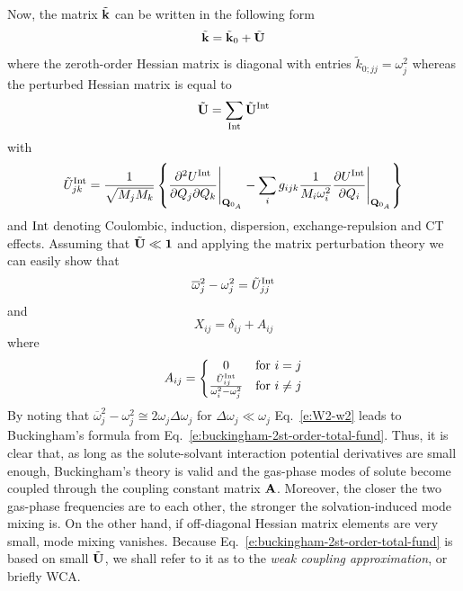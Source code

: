 \documentclass[a4paper,titlepage,twoside,fleqn,12pt]{book}
\newcommand{\fderiv}[2]{\ensuremath{
\frac{\partial #1}{\partial #2}}}
\newcommand{\sderivd}[3]{\ensuremath{
\frac{\partial^2 #1}{\partial #2 \partial #3}
}}
\begin{document}
\begin{refsection}
Now, 
the matrix $\tilde{\bf k}$ can be written
in the following form
%
\begin{equation} 
 \tilde{\bf k} = \tilde{\bf k}_0 + \tilde{\bf U}
\end{equation}
%
where the zeroth\hyp{}order Hessian matrix is diagonal
with entries $\tilde{k}_{0;jj}=\omega_j^2$ whereas
the perturbed Hessian matrix is equal to
%
\begin{equation} 
 \tilde{\bf U} = \sum_{\rm Int} \tilde{\bf U}^{\rm Int}
\end{equation}
%
with
%
\begin{equation} 
 \tilde{U}^{\rm Int}_{jk} = \frac{1}{\sqrt{M_jM_k}} \left\{
            \sderivd{U^{\rm Int}}{Q_j}{Q_k}  \Bigg|_{{\bf Q}_{0_A}} 
           - \sum_i g_{ijk} \frac{1}{M_i\omega_i^2}\fderiv{U^{\rm Int}}{Q_i} \Bigg|_{{\bf Q}_{0_A}} 
           \right\}
\end{equation}
%
and $\rm Int$ denoting Coulombic, induction, dispersion, exchange\hyp{}repulsion
and CT effects. Assuming that $\tilde{\bf U}\ll {\bf 1}$ and applying the
matrix perturbation theory we can easily show that
%
\begin{equation} \label{e:W2-w2}
 \overline{\omega}_j^2 - {\omega}_j^2 = 
 \tilde{U}^{\rm Int}_{jj}
\end{equation}
%
and
%
\begin{equation}
 X_{ij} = \delta_{ij} + A_{ij}
\end{equation}
%
where
%
\begin{equation}
 A_{ij} = 
\left\{\begin{matrix}
0 &\text{for $i=j$}\\ 
\frac{\tilde{U}^{\rm Int}_{ij}}{\omega_i^2-\omega_j^2} &\text{for $i\ne j$}
\end{matrix}\right.
\end{equation}
%
By noting that $\overline{\omega}_j^2 - {\omega}_j^2 \cong 2\omega_j\Delta\omega_j$
for $\Delta\omega_j\ll \omega_j$ Eq.~\eqref{e:W2-w2} leads
to Buckingham's formula from Eq.~\eqref{e:buckingham-2st-order-total-fund}.
Thus, it is clear that, as long as the solute\hyp{}solvant
interaction potential derivatives are small enough, Buckingham's theory
is valid and the gas\hyp{}phase modes of solute become coupled
through the coupling constant matrix $\bf A$. Moreover, the closer
the two gas\hyp{}phase frequencies are to each other, the stronger the solvation\hyp{}induced
mode mixing is. On the other hand, if off\hyp{}diagonal Hessian matrix elements are
very small, mode mixing vanishes. Because Eq.~\eqref{e:buckingham-2st-order-total-fund}
is based on small $\tilde{\bf U}$, we shall refer to it
as to the \emph{weak coupling approximation}, or briefly WCA.


\end{refsection}
\end{document}
